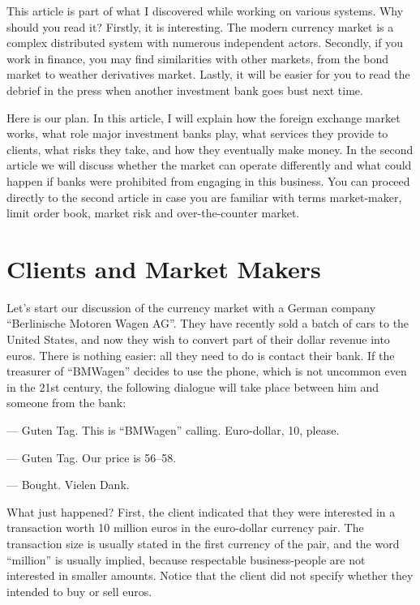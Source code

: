\documentclass[a4paper,14pt]{extarticle}
\begin{document}
This article is part of what I discovered while working on various systems. Why 
should you read it? Firstly, it is interesting. The modern currency market is a 
complex distributed system with numerous independent actors. Secondly, if you 
work in finance, you may find similarities with other markets, from the bond 
market to weather derivatives market. Lastly, it will be easier for you to 
read the debrief in the press when another investment bank goes bust next time.

Here is our plan. In this article, I will explain how the foreign exchange 
market works, what role major investment banks play, what services they provide 
to clients, what risks they take, and how they eventually make money. In the 
second article we will discuss whether the market can operate differently and 
what could happen if banks were prohibited from engaging in this business. You 
can proceed directly to the second article in case you are familiar with terms 
market-maker, limit order book, market risk and over-the-counter market.

\section*{Clients and Market Makers}

Let's start our discussion of the currency market with a German company 
``Berlinische Motoren Wagen AG''. They have recently sold a batch of cars to
the United States, and now they wish to convert part of their dollar revenue 
into euros. There is nothing easier: all they need to do is contact their bank. 
If the treasurer of ``BMWagen'' decides to use the phone, which is not uncommon 
even in the 21st century, the following dialogue will take place between him 
and someone from the bank:

--- Guten Tag. This is ``BMWagen'' calling. Euro-dollar, 10, please.

--- Guten Tag. Our price is 56--58.

--- Bought. Vielen Dank.

What just happened? First, the client indicated that they were interested in a 
transaction worth 10 million euros in the euro-dollar currency pair. The 
transaction size is usually stated in the first currency of the pair, and the 
word ``million'' is usually implied, because respectable business-people are not 
interested in smaller amounts. Notice that the client did not specify whether 
they intended to buy or sell euros.
\end{document}
